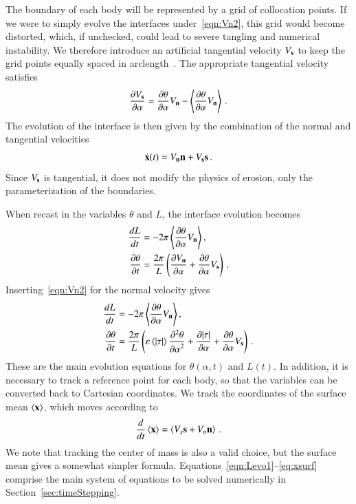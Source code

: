 \documentclass[preprint, 10pt]{elsarticle}
\begin{document}
The boundary of each body will be represented by a grid of collocation points. If we were to simply evolve the interfaces under~\eqref{eqn:Vn2}, this grid would become distorted, which, if unchecked, could lead to severe tangling and numerical instability. We therefore introduce an artificial tangential velocity $V_{\mathbf{s}}$ to keep the grid points equally spaced in arclength~\cite{hou-low-she1994}. The appropriate tangential velocity satisfies 
\begin{align}
  \frac{\partial V_{\mathbf{s}}}{\partial \alpha} = \frac{\partial \theta}{\partial \alpha} V_{\mathbf{n}} - \left< \frac{\partial \theta}{\partial \alpha} V_{\mathbf{n}} \right> \, .
\end{align} 
The evolution of the interface is then given by the combination of the normal and tangential velocities
\begin{align}
  \dot{{\mathbf{x}}}(t) = V_{\mathbf{n}} {\mathbf{n}} + V_{\mathbf{s}} {\mathbf{s}} \, .
\end{align}
Since $V_{\mathbf{s}}$ is tangential, it does not modify the physics of erosion, only the parameterization of the boundaries.

When recast in the variables $\theta$ and $L$, the interface evolution becomes
\begin{align}
  \frac{d L}{d t} &= - 2 \pi \left< \frac{\partial \theta}{\partial \alpha} V_{\mathbf{n}} \right>, \\
  \frac{\partial \theta}{\partial t} &= \frac{2 \pi}{L} \left( \frac{\partial V_{\mathbf{n}}}{\partial \alpha} + \frac{\partial \theta}{\partial \alpha} V_{\mathbf{s}} \right) \, .
\end{align}
Inserting~\eqref{eqn:Vn2} for the normal velocity gives
\begin{align}
\label{eqn:Levo1}
\frac{d L}{d t} &= - 2 \pi \left< \frac{\partial \theta}{\partial \alpha} V_{\mathbf{n}} \right>, \\
\label{eqn:thetaevo1}
  \frac{\partial \theta}{\partial t} &= \frac{2\pi}{L} \left(
  \varepsilon \left< \lvert \tau \rvert \right> \frac{\partial^2 \theta}{{\partial \alpha}^2} + \frac{\partial \lvert \tau \rvert}{\partial \alpha} +
  \frac{\partial \theta}{\partial \alpha} V_{\mathbf{s}} \right)\,.
\end{align}
These are the main evolution equations for $\theta(\alpha,t)$ and $L(t)$.  In addition, it is necessary to track a reference point for each body, so that the {\thL} variables can be converted back to Cartesian coordinates. We track the coordinates of the surface mean $\left< {\mathbf{x}} \right>$, which moves according to
\begin{align}
\label{eq:xsurf}
\frac{d}{dt} \left< {\mathbf{x}} \right> = \left<  V_s {\mathbf{s}} + V_n {\mathbf{n}}  \right> \, .
\end{align}
We note that tracking the center of mass is also a valid choice, but the surface mean gives a somewhat simpler formula. Equations~\eqref{eqn:Levo1}--\eqref{eq:xsurf} comprise the main system of equations to be solved numerically in Section~\ref{sec:timeStepping}. 
\end{document}
